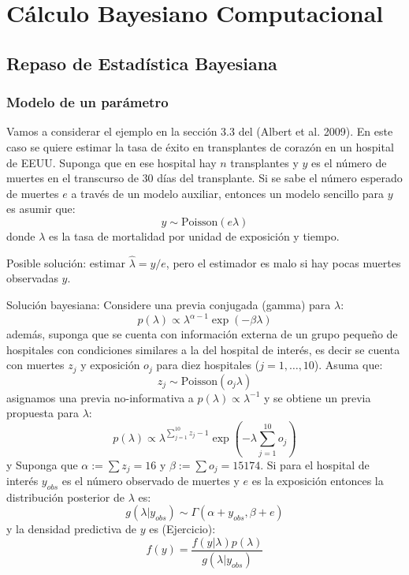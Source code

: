 \documentclass[
  12pt,
]{book}
\begin{document}
\hypertarget{cuxe1lculo-bayesiano-computacional}{%
\chapter{Cálculo Bayesiano
Computacional}\label{cuxe1lculo-bayesiano-computacional}}

\hypertarget{repaso-de-estaduxedstica-bayesiana}{%
\section{Repaso de Estadística
Bayesiana}\label{repaso-de-estaduxedstica-bayesiana}}

\hypertarget{modelo-de-un-paruxe1metro}{%
\subsection{Modelo de un parámetro}\label{modelo-de-un-paruxe1metro}}

Vamos a considerar el ejemplo en la sección 3.3 del (Albert et al.
2009). En este caso se quiere estimar la tasa de éxito en transplantes
de corazón en un hospital de EEUU. Suponga que en ese hospital hay \(n\)
transplantes y \(y\) es el número de muertes en el transcurso de 30 días
del transplante. Si se sabe el número esperado de muertes \(e\) a través
de un modelo auxiliar, entonces un modelo sencillo para \(y\) es asumir
que: \[y\sim \text{Poisson}(e\lambda)\] donde \(\lambda\) es la tasa de
mortalidad por unidad de exposición y tiempo.

Posible solución: estimar \(\hat \lambda=y/e\), pero el estimador es
malo si hay pocas muertes observadas \(y\).

Solución bayesiana: Considere una previa conjugada (gamma) para
\(\lambda\):
\[p(\lambda)\propto \lambda^{\alpha-1}\exp(-\beta \lambda)\] además,
suponga que se cuenta con información externa de un grupo pequeño de
hospitales con condiciones similares a la del hospital de interés, es
decir se cuenta con muertes \(z_j\) y exposición \(o_j\) para diez
hospitales (\(j=1,\ldots,10\)). Asuma que:
\[z_j\sim \text{Poisson}(o_j\lambda)\] asignamos una previa
no-informativa a \(p(\lambda)\propto \lambda^{-1}\) y se obtiene un
previa propuesta para \(\lambda\):
\[p(\lambda)\propto \lambda^{\sum_{j=1}^{10}z_j-1}\exp{\left(-\lambda\sum_{j=1}^{10} o_j\right)}\]y
Suponga que \(\alpha:=\sum z_j=16\) y \(\beta:=\sum o_j=15174\). Si para
el hospital de interés \(y_{obs}\) es el número observado de muertes y
\(e\) es la exposición entonces la distribución posterior de \(\lambda\)
es: \[g(\lambda|y_{obs})\sim \Gamma(\alpha+y_{obs},\beta+e)\] y la
densidad predictiva de \(y\) es (Ejercicio):
\[f(y)=\frac{f(y|\lambda)p(\lambda)}{g(\lambda|y_{obs})}\]
\end{document}
